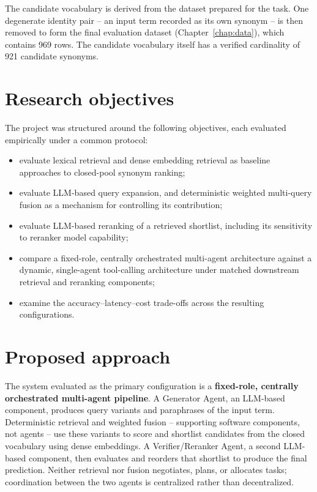 The candidate vocabulary is derived from the dataset prepared for the task. One degenerate identity pair -- an input term recorded as its own synonym -- is then removed to form the final evaluation dataset (Chapter~\ref{chap:data}), which contains 969 rows. The candidate vocabulary itself has a verified cardinality of 921 candidate synonyms.

\section{Research objectives}

The project was structured around the following objectives, each evaluated empirically under a common protocol:

\begin{itemize}
  \item evaluate lexical retrieval and dense embedding retrieval as baseline approaches to closed-pool synonym ranking;
  \item evaluate LLM-based query expansion, and deterministic weighted multi-query fusion as a mechanism for controlling its contribution;
  \item evaluate LLM-based reranking of a retrieved shortlist, including its sensitivity to reranker model capability;
  \item compare a fixed-role, centrally orchestrated multi-agent architecture against a dynamic, single-agent tool-calling architecture under matched downstream retrieval and reranking components;
  \item examine the accuracy--latency--cost trade-offs across the resulting configurations.
\end{itemize}

\section{Proposed approach}

The system evaluated as the primary configuration is a \textbf{fixed-role, centrally orchestrated multi-agent pipeline}. A Generator Agent, an LLM-based component, produces query variants and paraphrases of the input term. Deterministic retrieval and weighted fusion -- supporting software components, not agents -- use these variants to score and shortlist candidates from the closed vocabulary using dense embeddings. A Verifier/Reranker Agent, a second LLM-based component, then evaluates and reorders that shortlist to produce the final prediction. Neither retrieval nor fusion negotiates, plans, or allocates tasks; coordination between the two agents is centralized rather than decentralized.

